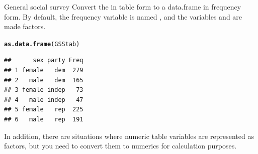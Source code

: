 \documentclass[11pt]{book}\usepackage[]{graphicx}\usepackage[]{color}
\makeatletter
\newcommand{\hlstd}[1]{\textcolor[rgb]{0.345,0.345,0.345}{#1}}%
\newcommand{\hlkwd}[1]{\textcolor[rgb]{0.737,0.353,0.396}{\textbf{#1}}}%
\newenvironment{kframe}{%
 \def\at@end@of@kframe{}%
 \ifinner\ifhmode%
  \def\at@end@of@kframe{\end{minipage}}%
  \begin{minipage}{\columnwidth}%
 \fi\fi%
 \def\FrameCommand##1{\hskip\@totalleftmargin \hskip-\fboxsep
 \colorbox{shadecolor}{##1}\hskip-\fboxsep
     \hskip-\linewidth \hskip-\@totalleftmargin \hskip\columnwidth}%
 \MakeFramed {\advance\hsize-\width
   \@totalleftmargin\z@ \linewidth\hsize
   \@setminipage}}%
 {\par\unskip\endMakeFramed%
 \at@end@of@kframe}
\newenvironment{knitrout}{}{} %
\renewenvironment{knitrout}{\small\renewcommand{\baselinestretch}{.85}}{} %
\makeatother
\begin{document}
\begin{Example}{General social survey}
Convert the  in table form to a data.frame in frequency form.
By default, the frequency variable is named , and the variables
 and  are made factors.
\begin{knitrout}
\color{fgcolor}\begin{kframe}
\begin{alltt}
\hlkwd{as.data.frame}\hlstd{(GSStab)}
\end{alltt}
\begin{verbatim}
##      sex party Freq
## 1 female   dem  279
## 2   male   dem  165
## 3 female indep   73
## 4   male indep   47
## 5 female   rep  225
## 6   male   rep  191
\end{verbatim}
\end{kframe}
\end{knitrout}

\end{Example}

In addition, there are situations where numeric table variables are represented as
factors, but you need to
convert them to numerics for calculation purposes.
\end{document}
